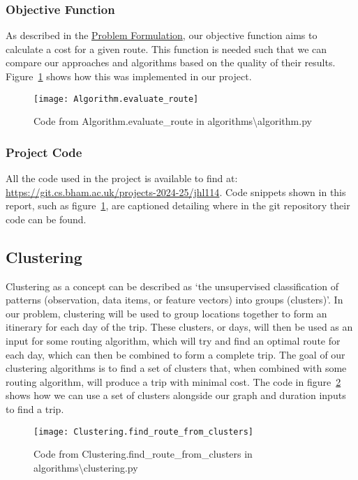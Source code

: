 \subsubsection{Objective Function}\label{subsubsec:algorithms-objective-function}
As described in the \hyperref[sec:problem-formulation]{Problem Formulation}, our objective function aims to
calculate a cost for a given route.
This function is needed such that we can compare our approaches and algorithms based on the quality of their results.
Figure~\ref{fig:Algorithm.evaluate_route} shows how this was implemented in our project.
\begin{figure}[H]
    \centering
    \texttt{[image: Algorithm.evaluate\_route]}
    \caption{Code from Algorithm.evaluate\_route in algorithms\textbackslash algorithm.py}
    \label{fig:Algorithm.evaluate_route}
\end{figure}

\subsubsection{Project Code}\label{subsubsec:project-code}
All the code used in the project is available to find at: \url{https://git.cs.bham.ac.uk/projects-2024-25/jhl114}.
Code snippets shown in this report, such as figure~\ref{fig:Algorithm.evaluate_route}, are captioned
detailing where in the git repository their code can be found.

\subsection{Clustering}\label{subsec:clustering}
Clustering as a concept can be described as `the unsupervised classification of patterns (observation, data items, or
feature vectors) into groups (clusters)'.
In our problem, clustering will be used to group locations together to form an itinerary for each day of the trip.
These clusters, or days, will then be used as an input for some routing algorithm, which will try and find an
optimal route for each day, which can then be combined to form a complete trip.
The goal of our clustering algorithms is to find a set of clusters that, when combined with some routing algorithm,
will produce a trip with minimal cost.
The code in figure~\ref{fig:Clustering.find_route_from_clusters} shows how we can use a set of clusters alongside our
graph and duration inputs to find a trip.
\begin{figure}[H]
    \centering
    \texttt{[image: Clustering.find\_route\_from\_clusters]}
    \caption{Code from Clustering.find\_route\_from\_clusters in algorithms\textbackslash clustering.py}
    \label{fig:Clustering.find_route_from_clusters}
\end{figure}

